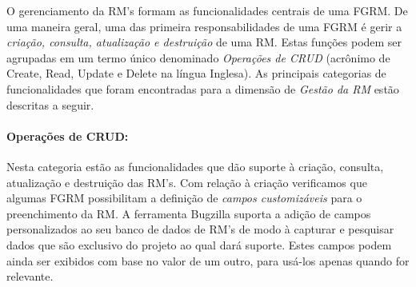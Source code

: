 \begin{table}[htpb]
\centering
{}
\caption{Frequência de cada categoria de funcionalidade no conjunto de cartões
	obtidos.}
\label{tab:freq_categorias_cartoes}
\end{table}


O gerenciamento da RM's formam as funcionalidades centrais de uma FGRM. De uma
maneira geral, uma das primeira responsabilidades de uma FGRM é gerir a
\textit{criação, consulta, atualização e destruição} de uma RM. Estas funções
podem ser agrupadas em um termo único denominado \textit{Operações de CRUD}
(acrônimo de Create, Read, Update e Delete na língua Inglesa). As principais
categorias de funcionalidades que foram encontradas para a dimensão de
\textit{Gestão da RM} estão descritas a seguir.

\paragraph{Operações de CRUD:}
\label{par:operações_de_crud}

Nesta categoria estão as funcionalidades que dão suporte à criação,	consulta,
atualização e destruição das RM's. Com relação à criação verificamos que algumas
FGRM possibilitam a definição de \textit{campos customizáveis} para o
preenchimento da RM. A ferramenta Bugzilla suporta a adição de campos
personalizados ao seu banco de dados de RM's de modo à capturar e pesquisar
dados que são exclusivo do projeto ao qual dará suporte. Estes campos podem
ainda ser exibidos com base no valor de um outro, para usá-los apenas quando for
relevante.

